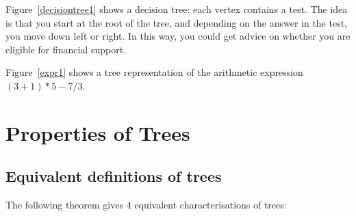 Figure~\ref{decisiontree1} shows a decision tree: each vertex
contains a test. The idea is that you start at the root of the tree,
and depending on the answer in the test, you move down left or
right. In this way, you could get advice on whether you are eligible
for financial support.


Figure~\ref{expr1} shows a tree representation of the arithmetic
expression $(3+1) *5 - 7/3$.

\section{Properties of Trees}
\subsection{Equivalent definitions of trees}
The following theorem gives 4 equivalent characterisations of trees:

